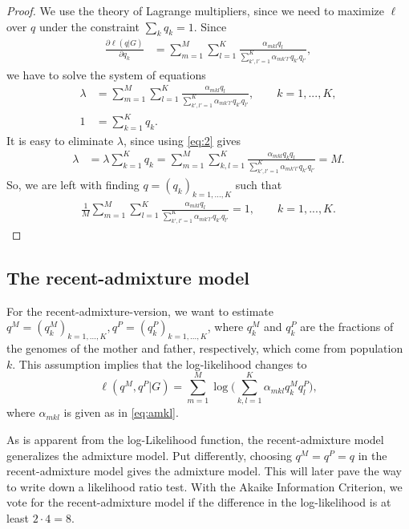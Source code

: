 \documentclass[12pt]{article}
\theoremstyle{definition}
\begin{document}
\begin{proof}
  We use the theory of Lagrange multipliers, since we need to maximize
  $\ell$ over $q$ under the constraint $\sum_k q_k=1$.
  Since
  \begin{align*}
    \frac{\partial \ell(q|G)}{\partial q_k} & = \sum_{m=1}^M \sum_{l=1}^K \frac{\alpha_{mkl}q_l}{\sum_{k',l'=1}^K
                                              \alpha_{mk'l'}q_{k'}q_{l'}},
  \end{align*}
  we have to solve the system of equations
  \begin{align}\label{eq:1}
    \lambda & = \sum_{m=1}^M \sum_{l=1}^K \frac{\alpha_{mkl}q_l}{\sum_{k',l'=1}^K \alpha_{mk'l'}q_{k'}q_{l'}}, \qquad k=1,...,K,
    \\\label{eq:2}
    1 & = \sum_{k=1}^K q_k.
  \end{align}
  It is easy to eliminate $\lambda$, since using \eqref{eq:2} gives
  \begin{align*}
    \lambda & = \lambda \sum_{k=1}^K q_k = \sum_{m=1}^M \sum_{k,l=1}^K
              \frac{\alpha_{mkl}q_kq_l}{\sum_{k',l'=1}^K \alpha_{mk'l'}q_{k'}q_{l'}} = M.
  \end{align*}
  So, we are left with finding $q = (q_k)_{k=1,...,K}$ such that
  \begin{align}\label{eq:1}
    \frac{1}{M}\sum_{m=1}^M \sum_{l=1}^K \frac{\alpha_{mkl}q_l}{\sum_{k',l'=1}^K \alpha_{mk'l'}q_{k'}q_{l'}} = 1, \qquad k=1,...,K.
  \end{align}
\end{proof}


\subsection{The recent-admixture model}
\noindent
For the recent-admixture-version, we want to estimate
$q^M=(q^M_{k})_{k=1,...,K}, q^P=(q^P_{k})_{k=1,...,K}$, where
$q^M_{k}$ and $q^P_k$ are the fractions of the genomes of the mother
and father, respectively, which come from population $k$.  This
assumption implies that the log-likelihood changes to
$$ \ell(q^M, q^P|G) = \sum_{m=1}^M  \log\Big(\sum_{k,l=1}^K \alpha_{mkl}q_{k}^M q_l^P\Big),$$
where $\alpha_{mkl}$ is given as in \eqref{eq:amkl}.

As is apparent from the log-Likelihood function, the recent-admixture
model generalizes the admixture model. Put differently, choosing
$q^M = q^P = q$ in the recent-admixture model gives the admixture
model. This will later pave the way to write down a likelihood ratio
test. With the Akaike Information Criterion, we vote for the
recent-admixture model if the difference in the log-likelihood is at
least $2\cdot 4 = 8.$
\end{document}
